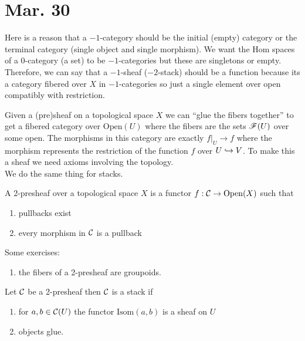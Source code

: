 \documentclass[12pt]{article}
\begin{document}
\section{Mar. 30}

\begin{rmk}
Here is a reason that a $-1$-category should be the initial (empty) category or the terminal category (single object and single morphism). We want the Hom spaces of a $0$-category (a set) to be $-1$-categories but these are singletons or empty. Therefore, we can say that a $-1$-sheaf ($-2$-stack) should be a function because its a category fibered over $X$ in $-1$-categories so just a single element over open compatibly with restriction. 
\end{rmk}

Given a (pre)sheaf on a topological space $X$ we can ``glue the fibers together'' to get a fibered category over $\mathrm{Open}(U)$ where the fibers are the sets $\mathscr{F}(U)$ over some open. The morphisms in this category are exactly $f|_U \to f$ where the morphism represents the restriction of the function $f$ over $U \hookrightarrow V$. To make this a sheaf we need axioms involving the topology. 
\bigskip\\
We do the same thing for stacks.

\begin{defn}
A 2-presheaf over a topological space $X$ is a functor $f : \mathcal{C} \to \mathrm{Open}(X)$ such that
\begin{enumerate}
\item pullbacks exist
\item every morphism in $\mathcal{C}$ is a pullback
\end{enumerate}
\end{defn}

\begin{rmk}
Some exercises:
\begin{enumerate}
\item the fibers of a 2-presheaf are groupoids. 
\end{enumerate}
\end{rmk}

\newcommand{\Isom}[2]{\mathrm{Isom}\left(#1, #2\right)}

\begin{defn}
Let $\mathcal{C}$ be a 2-presheaf then $\mathcal{C}$ is a stack if
\begin{enumerate}
\item for $a, b \in \mathcal{C}(U)$ the functor $\Isom{a}{b}$ is a sheaf on $U$
\item objects glue. 
\end{enumerate}
\end{defn}
\end{document}
